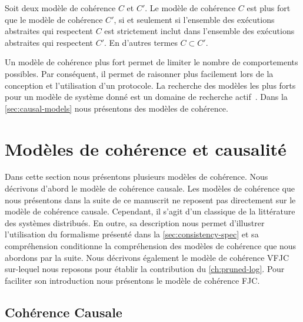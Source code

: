 \begin{definition}\label{def:consistency-hierearchy}
Soit deux modèle de cohérence $C$ et $C'$.
Le modèle de cohérence $C$ est plus fort que le modèle de cohérence $C'$, si et seulement si l'ensemble des exécutions abstraites qui respectent $C$ est strictement inclut dans l'ensemble des exécutions abstraites qui respectent $C'$.
En d'autres termes $C \subset C'$.
\end{definition}

Un modèle de cohérence plus fort permet de limiter le nombre de comportements possibles.
Par conséquent, il permet de raisonner plus facilement lors de la conception et l'utilisation d'un protocole.
La recherche des modèles les plus forts pour un modèle de système donné est un domaine de recherche actif~\cite{mahajan_2011_cac,guerraoui_2016_tradeoffs-replication,viotti_consistency_2016}.
Dans la \autoref{sec:causal-models} nous présentons des modèles de cohérence.


\section{Modèles de cohérence et causalité}\label{sec:causal-models}

Dans cette section nous présentons plusieurs modèles de cohérence.
Nous décrivons d'abord le modèle de cohérence causale.
Les modèles de cohérence que nous présentons dans la suite de ce manuscrit ne reposent pas directement sur le modèle de cohérence causale.
Cependant, il s'agit d'un classique de la littérature des systèmes distribués.
En outre, sa description nous permet d'illustrer l'utilisation du formalisme présenté dans la \autoref{sec:consistency-spec} et sa compréhension conditionne la compréhension des modèles de cohérence que nous abordons par la suite.
Nous décrivons également le modèle de cohérence \acf{VFJC} sur-lequel nous reposons pour établir la contribution du \autoref{ch:pruned-log}.
Pour faciliter son introduction nous présentons le modèle de cohérence \acf{FJC}.


\subsection{Cohérence Causale}\label{subsec:caucal-consistency}

